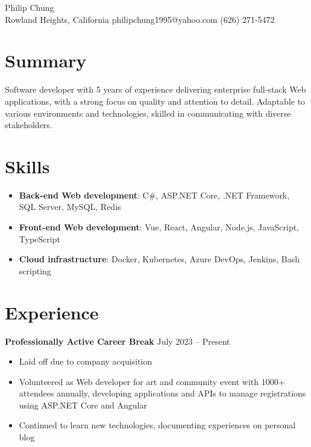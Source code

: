 \documentclass[12pt]{article}
\newcommand{\titleheader}[2]{\textbf{#1} \symbol{"B7} #2}
\begin{document}
	\begin{center}
		{\headerfont\fontsize{24pt}{24pt}\selectfont Philip Chung} \\ \vspace{0.5em}
		Rowland Heights, California  philipchung1995@yahoo.com  (626) 271-5472
	\end{center}

	\section*{Summary}

	Software developer with 5 years of experience delivering enterprise full-stack Web applications, with a strong focus on quality and attention to detail. Adaptable to various environments and technologies, skilled in communicating with diverse stakeholders.

	\section*{Skills}

	\newcommand{\skillitem}[2]{\item \textbf{#1}: #2}

	\begin{itemize}[left=0.25in .. 0.25in,label={},itemindent=-0.25in]
		\skillitem{Back-end Web development}{C\#, ASP.NET Core, .NET Framework, SQL Server, MySQL, Redis}
		\skillitem{Front-end Web development}{Vue, React, Angular, Node.js, JavaScript, TypeScript}
		\skillitem{Cloud infrastructure}{Docker, Kubernetes, Azure DevOps, Jenkins, Bash scripting}
	\end{itemize}

	\section*{Experience}

	\titleheader{Professionally Active Career Break}{July 2023 -- Present}

	\begin{itemize}
		\item Laid off due to company acquisition
		\item Volunteered as Web developer for art and community event with 1000+ attendees annually, developing applications and APIs to manage registrations using ASP.NET Core and Angular
		\item Continued to learn new technologies, documenting experiences on personal blog
	\end{itemize}
\end{document}
